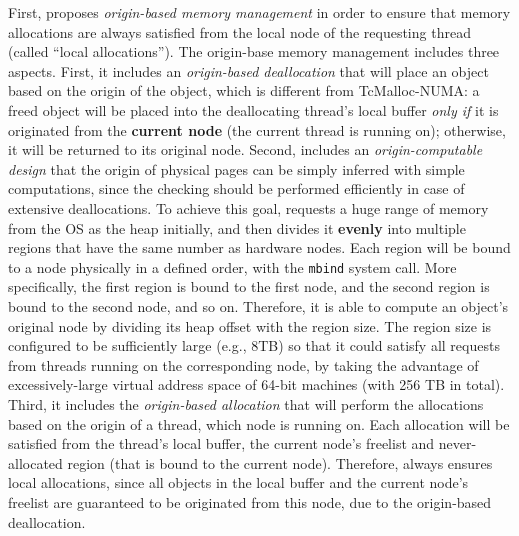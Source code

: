 First, \NM{} proposes \textit{origin-based memory management} in order to ensure that memory allocations are always satisfied from the local node of the requesting thread (called ``local allocations''). The origin-base memory management includes three aspects. First, it includes an \textit{origin-based deallocation} that will place an object based on the origin of the object, which is different from TcMalloc-NUMA: a freed object will be placed into the deallocating thread's local buffer \textit{only if} it is originated from the \textbf{current node} (the current thread is running on); otherwise, it will be returned to its original node. Second, \NM{} includes an \textit{origin-computable design} that the origin of physical pages can be simply inferred with simple computations, since the checking should be performed efficiently in case of extensive deallocations. To achieve this goal, \NM{} requests a huge range of memory from the OS as the heap initially, and then divides it \textbf{evenly} into multiple regions that have the same number as hardware nodes. Each region will be bound to a node physically in a defined order, with the \texttt{mbind} system call. More specifically, the first region is bound to the first node, and the second region is bound to the second node, and so on. Therefore, it is able to compute an object's original node by dividing its heap offset with the region size. The region size is configured to be sufficiently large (e.g., 8TB) so that it could satisfy all requests from threads running on the corresponding node, by taking the advantage of excessively-large virtual address space of 64-bit machines (with 256 TB in total).
Third, it includes the \textit{origin-based allocation} that will perform the allocations based on the origin of a thread, which node is running on.  Each allocation will be satisfied from the thread's local buffer, the current node's freelist and never-allocated region (that is bound to the current node). Therefore, \NM{} always ensures local allocations, since all objects in the local buffer and the current node's freelist are guaranteed to be originated from this node, due to the origin-based deallocation. 


